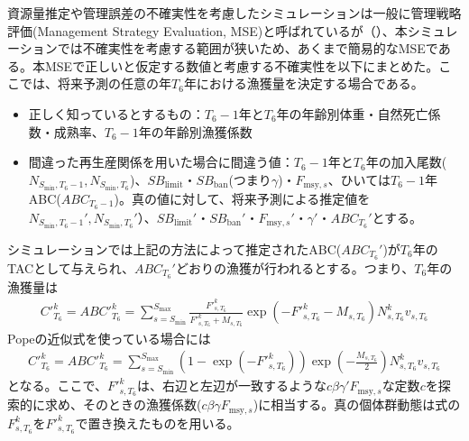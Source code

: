 \documentclass[11pt]{jsarticle}
\begin{document}
資源量推定や管理誤差の不確実性を考慮したシミュレーションは一般に管理戦略評価(Management Strategy Evaluation, MSE)と呼ばれているが（\cite{punt}）、本シミュレーションでは不確実性を考慮する範囲が狭いため、あくまで簡易的なMSEである。本MSEで正しいと仮定する数値と考慮する不確実性を以下にまとめた。ここでは、将来予測の任意の年$T_6$年における漁獲量を決定する場合である。
\begin{itemize}
\item 正しく知っているとするもの：$T_6-1$年と$T_6$年の年齢別体重・自然死亡係数・成熟率、$T_6-1$年の年齢別漁獲係数
\item 間違った再生産関係を用いた場合に間違う値：$T_6-1$年と$T_6$年の加入尾数($N_{S_{\mathrm{min}},T_6 -1}, N_{S_{\mathrm{min}},T_6}$)、$S\!B_{\mathrm{limit}}$・$S\!B_{\mathrm{ban}}$(つまり$\gamma$)・$F_{\mathrm{msy},s}$、ひいては$T_6-1$年ABC($ABC_{T_6-1}$)。真の値に対して、将来予測による推定値を$N_{S_{\mathrm{min}},T_6-1}', N_{S_{\mathrm{min}},T_6}'$）、$S\!B_{\mathrm{limit}}'$・$S\!B_{\mathrm{ban}}'$・$F_{\mathrm{msy},s}'$・$\gamma'$・$ABC_{T_6}'$とする。
\end{itemize}

シミュレーションでは上記の方法によって推定されたABC($ABC_{T_6}'$)が$T_6$年のTACとして与えられ、$ABC_{T_6}'$どおりの漁獲が行われるとする。つまり、$T_6$年の漁獲量は
\begin{eqnarray}
  {C'}_{T_6}^{k}={ABC'}_{T_6}^{k}=\sum_{s=S_{\mathrm{min}}}^{S_{\mathrm{max}}} \frac{{F'}_{s,T_6}^k}{{F'}_{s,T_6}^k+M_{s,T_6}}
  \exp(- {F'}_{s,T_6}^k - M_{s,T_6}) N_{s,T_6}^k v_{s,T_6}
\label{ABC_MSE_eq1}
\end{eqnarray}
Popeの近似式を使っている場合には
\begin{eqnarray}
  {C'}_{T_6}^k={ABC'}_{T_6}^{k}=\sum_{s=S_{\mathrm{min}}}^{S_{\mathrm{max}}} (1-\exp(- {F'}_{s,T_6}^k)) \exp(-\frac{M_{s,T_6}}{2}) N_{s,T_6}^k v_{s,T_6}
\label{ABC_MSE_eq2}
\end{eqnarray}
となる。ここで、${F'}_{s,T_6}^k$は、右辺と左辺が一致するような$c \beta \gamma' F_{\mathrm{msy},s}$な定数$c$を探索的に求め、そのときの漁獲係数($c \beta \gamma F_{\mathrm{msy},s}$)に相当する。真の個体群動態は式\label{future_eq3}の$F_{s,T_6}^k$を${F'}_{s,T_6}^k$で置き換えたものを用いる。
\end{document}
